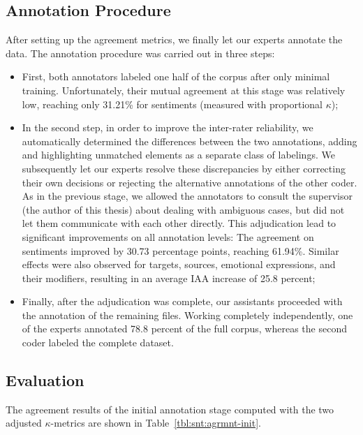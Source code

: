 \subsection{Annotation Procedure}\label{sec:astages}
After setting up the agreement metrics, we finally let our experts
annotate the data.  The annotation procedure was carried out in three
steps:
\begin{itemize}
  \item First, both annotators labeled one half of the corpus after
    only minimal training.  Unfortunately, their mutual agreement at
    this stage was relatively low, reaching only 31.21\% for
    sentiments (measured with proportional $\kappa$);
  \item In the second step, in order to improve the inter-rater
    reliability, we automatically determined the differences between
    the two annotations, adding and highlighting unmatched elements as
    a separate class of labelings. We subsequently let our experts
    resolve these discrepancies by either correcting their own
    decisions or rejecting the alternative annotations of the other
    coder.  As in the previous stage, we allowed the annotators to
    consult the supervisor (the author of this thesis) about dealing
    with ambiguous cases, but did not let them communicate with each
    other directly.  This adjudication lead to significant
    improvements on all annotation levels: The agreement on sentiments
    improved by 30.73 percentage points, reaching 61.94\%.  Similar
    effects were also observed for targets, sources, emotional
    expressions, and their modifiers, resulting in an average IAA
    increase of 25.8 percent;
  \item Finally, after the adjudication was complete, our assistants
    proceeded with the annotation of the remaining files.  Working
    completely independently, one of the experts annotated 78.8
    percent of the full corpus, whereas the second coder labeled the
    complete dataset.
\end{itemize}

\subsection{Evaluation}\label{sec:eval}
The agreement results of the initial annotation stage computed with
the two adjusted $\kappa$-metrics are shown in
Table~\ref{tbl:snt:agrmnt-init}.

